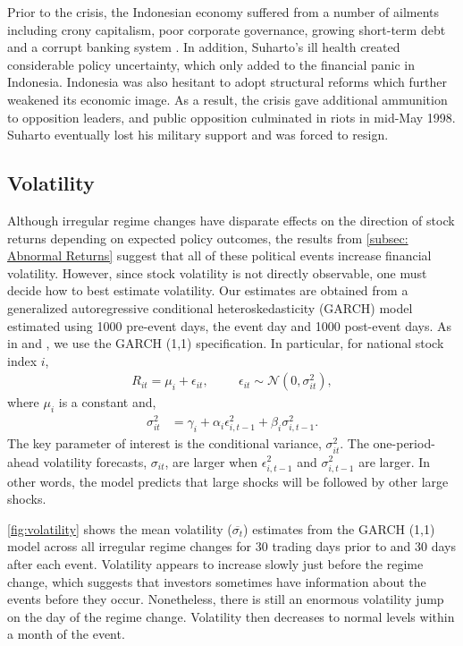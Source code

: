 \documentclass[12pt,final,fleqn]{article}
\theoremstyle{plain}
\begin{document}
Prior to the crisis, the Indonesian economy suffered from a number of ailments including crony capitalism, poor corporate governance, growing short-term debt and a corrupt banking system \citep{radelet2000onset}. In addition, Suharto's ill health created considerable policy uncertainty, which only added to the financial panic in Indonesia. Indonesia was also hesitant to adopt structural reforms which further weakened its economic image. As a result, the crisis gave additional ammunition to opposition leaders, and public opposition culminated in riots in mid-May 1998. Suharto eventually lost his military support and was forced to resign.

\subsection{Volatility} \label{subsec: Volatility}
Although irregular regime changes have disparate effects on the direction of stock returns depending on expected policy outcomes, the results from \autoref{subsec: Abnormal Returns} suggest that all of these political events increase financial volatility. However, since stock volatility is not directly observable, one must decide how to best estimate volatility. Our estimates are obtained from a generalized autoregressive conditional heteroskedasticity (GARCH) model estimated using 1000 pre-event days, the event day and 1000 post-event days. As in \citep{jensen2005market} and \citep{leblang2005government}, we use the GARCH (1,1) specification. In particular, for national stock index $i$,
\begin{align*}
R_{it}=\mu_i + \epsilon_{it},\hspace{1cm} \epsilon_{it}\sim \mathcal{N}\left(0,\sigma_{it}^2\right),
\end{align*}
where $\mu_i$ is a constant and,
\begin{align*}
\sigma_{it}^2&=\gamma_{i}+\alpha_{i}\epsilon_{i,t-1}^2+\beta_{i}\sigma_{i,t-1}^2.
\end{align*}
The key parameter of interest is the conditional variance, $\sigma_{it}^2$. The one-period-ahead volatility forecasts, $\sigma_{it}$, are larger when $\epsilon_{i,t-1}^2$ and $\sigma_{i,t-1}^2$ are larger. In other words, the model predicts that large shocks will be followed by other large shocks.

\autoref{fig:volatility} shows the mean volatility ($\overline{\sigma_t}$) estimates from the GARCH (1,1) model across all irregular regime changes for 30 trading days prior to and 30 days after each event. Volatility appears to increase slowly just before the regime change, which suggests that investors sometimes have information about the events before they occur. Nonetheless, there is still an enormous volatility jump on the day of the regime change. Volatility then decreases to normal levels within a month of the event.
\end{document}
